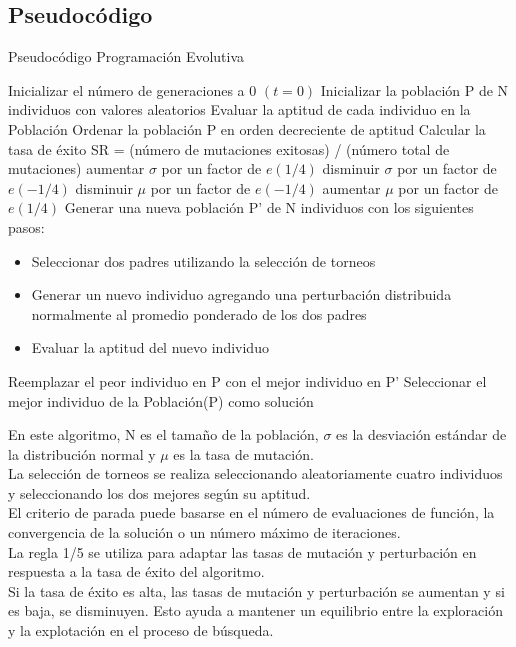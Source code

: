 \documentclass{article}
\begin{document}
\subsection{Pseudocódigo}
\begin{algorithm} \caption{Pseudocódigo Programación Evolutiva}
  \begin{algorithmic}[1]
    \State Inicializar el número de generaciones a 0 $(t=0)$
    \State Inicializar la población P de N individuos con valores aleatorios
    \State Evaluar la aptitud de cada individuo en la Población
    \Repeat
    \State Ordenar la población P en orden decreciente de aptitud
    \State Calcular la tasa de éxito SR = (número de mutaciones exitosas) / (número total de mutaciones)
    \State aumentar $\sigma$ por un factor de $e(1/4)$
    \Else
    \State disminuir $\sigma$ por un factor de $e(-1/4)$
    \EndIf
    \State disminuir $\mu$ por un factor de $e(-1/4)$
    \Else
    \State aumentar $\mu$ por un factor de $e(1/4)$
    \EndIf
    \State Generar una nueva población P' de N individuos con los siguientes pasos:
    \begin{itemize}
    \item Seleccionar dos padres utilizando la selección de torneos
    \item Generar un nuevo individuo agregando una perturbación distribuida normalmente al promedio ponderado de los dos padres
    \item Evaluar la aptitud del nuevo individuo
    \end{itemize}
    \State Reemplazar el peor individuo en P con el mejor individuo en P'
    \State Seleccionar el mejor individuo de la Población(P) como solución
  \end{algorithmic}
\end{algorithm}

En este algoritmo, N es el tamaño de la población, $\sigma$ es la desviación estándar de la distribución normal y $\mu$ es la tasa de mutación. \\La selección de torneos se realiza seleccionando aleatoriamente cuatro individuos y seleccionando los dos mejores según su aptitud. \\El criterio de parada puede basarse en el número de evaluaciones de función, la convergencia de la solución o un número máximo de iteraciones.\\

La regla 1/5 se utiliza para adaptar las tasas de mutación y perturbación en respuesta a la tasa de éxito del algoritmo. \\Si la tasa de éxito es alta, las tasas de mutación y perturbación se aumentan y si es baja, se disminuyen. Esto ayuda a mantener un equilibrio entre la exploración y la explotación en el proceso de búsqueda.\\
\end{document}

